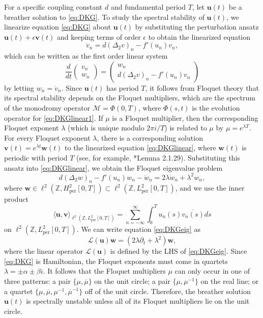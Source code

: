 \documentclass[12pt,reqno]{amsart}
\def\Z{{\mathbb Z}}
\def\per{\textrm{per}}
\def\calL{\mathcal{L}}
\def\calM{\mathcal{M}}
\newcommand{\uvec}{\mathbf{u}}
\newcommand{\vvec}{\mathbf{v}}
\newcommand{\wvec}{\mathbf{w}}
\theoremstyle{definition}
\begin{document}
For a specific coupling constant $d$ and fundamental period $T$, let $\uvec(t)$ be a breather solution to \cref{eq:DKG}. To study the spectral stability of $\uvec(t)$, we linearize equation \cref{eq:DKG} about $\uvec(t)$ by substituting the perturbation ansatz $\uvec(t) + \epsilon \vvec(t)$ and keeping terms of order $\epsilon$ to obtain the linearized equation
\begin{equation}\label{eq:DKGlinear}
\ddot{v}_n = d (\Delta_2 v)_n - f'(u_n)v_n,
\end{equation}
which can be written as the first order linear system
\begin{equation}\label{eq:DKGlinear1}
\frac{d}{dt} \begin{pmatrix} v_n \\ w_n \end{pmatrix} = 
\begin{pmatrix}
w_n \\ 
d (\Delta_2 v)_n - f'(u_n)v_n
\end{pmatrix}
\end{equation}
by letting $w_n = \dot{v}_n$. Since $\uvec(t)$ has period $T$, it follows from Floquet theory that its spectral stability depends on the Floquet multipliers, which are the spectrum of the monodromy operator $\calM = \Phi(0, T)$, where $\Phi(s, t)$ is the evolution operator for \cref{eq:DKGlinear1}. 
If $\mu$ is a Floquet multiplier, then the corresponding Floquet exponent $\lambda$ (which is unique modulo $2 \pi i/T$) is related to $\mu$ by $\mu = e^{\lambda T}$. 
For every Floquet exponent $\lambda$, there is a corresponding solution $\vvec(t) = e^{\lambda t} \wvec(t)$ to the linearized equation \cref{eq:DKGlinear}, where $\wvec(t)$ is periodic with period $T$ (see, for example, \cite{Kapitula2013}*{Lemma 2.1.29}). Substituting this ansatz into \cref{eq:DKGlinear}, we obtain the Floquet eigenvalue problem
\begin{equation}\label{eq:DKGeig}
d (\Delta_2 w)_n - f'(u_n)w_n - \ddot{w}_n = 2 \lambda \dot{w}_n + \lambda^2 w_n,
\end{equation}
where $\wvec \in \ell^2(\Z, H^2_\per[0,T]) \subset \ell^2(\Z, L^2_\per[0,T])$, and we use the inner product
\begin{equation}\label{eq:IP1}
\langle \uvec, \vvec \rangle_{\ell^2(\Z, L^2_\per[0,T])} = \sum_{n=-\infty}^\infty \int_0^T u_n(s) \overline{v_n(s)} ds
\end{equation}
on $\ell^2(\Z, L^2_\per[0,T])$. We can write equation \cref{eq:DKGeig} as 
\begin{equation}\label{eq:DKGeigL}
\calL(\uvec)\wvec = (2 \lambda \partial_t + \lambda^2 )\wvec,
\end{equation}
where the linear operator $\calL(\uvec)$ is defined by the LHS of \cref{eq:DKGeig}. Since \cref{eq:DKG} is Hamiltonian, the Floquet exponents must come in quartets $\lambda = \pm \alpha \pm \beta i$. It follows that the Floquet multipliers $\mu$ can only occur in one of three patterns: a pair $\{ \mu, \overline{\mu} \}$ on the unit circle; a pair $\{ \mu, \mu^{-1} \}$ on the real line; or a quartet $\{ \mu, \overline{\mu}, \mu^{-1}, \overline{\mu}^{-1} \}$ off of the unit circle. Therefore, the breather solution $\uvec(t)$ is spectrally unstable unless all of its Floquet multipliers lie on the unit circle.
\end{document}
